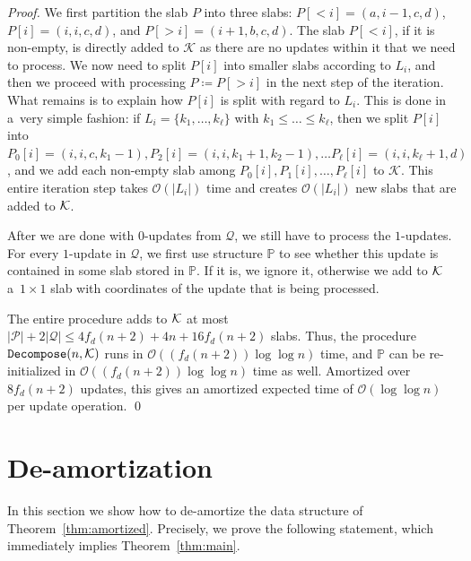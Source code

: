 \documentclass[runningheads]{llncs}
\newcommand{\Oh}{\mathcal{O}}
\renewcommand{\leq}{\leqslant}
\begin{document}
\begin{proof}
We first partition the slab $P$ into three slabs:
$P[<i] = (a,i-1,c,d)$,
$P[i]=(i,i,c,d)$, and
$P[>i]= (i+1,b,c,d)$. The slab $P[<i]$, if it is
non-empty, is directly added to $\mathcal{K}$ as there are
no updates within it that we need to process. We now need to
split $P[i]$ into smaller slabs according to $L_i$, and then we proceed with
processing
$P\coloneqq P[>i]$ in the next step of the iteration. What remains
is to explain how $P[i]$ is split with regard to $L_i$. This is
done in a~very simple fashion: if $L_i=\{ k_1,\ldots,k_\ell \}$ with $k_1\leq \ldots\leq k_\ell$, then
we split $P[i]$ into
$P_0[i]=(i,i,c,k_1-1), P_2[i]=(i,i,k_1+1,k_2-1),
\ldots P_{\ell}[i]=(i,i,k_\ell+1,d)$, and we add each non-empty
slab
among $P_0[i],P_1[i], \ldots, P_\ell[i]$ to $\mathcal{K}$.
This entire iteration step takes $\Oh(|L_i|)$ time and
creates $\Oh(|L_i|)$ new slabs that are added to $\cal K$.

After we are done with $0$-updates from $\mathcal{Q}$,
we still have to process the $1$-updates. For
every $1$-update in $\mathcal{Q}$, we first use
structure $\mathbb{P}$ to see whether this update is contained
in some slab stored in $\mathbb{P}$. If it is, we ignore it,
otherwise we add to $\cal K$ a~$1 \times 1$ slab with
coordinates of the update that is being processed.

The entire procedure adds to $\cal K$ at most
$|\mathcal{P}|+2|\mathcal{Q}| \leq 4 f_d(n+2)+4n + 16 f_d(n+2)$ slabs.
Thus, the procedure $\mathtt{Decompose}(n,\cal K)$
runs in $\Oh(( f_d (n+2))\log \log n)$ time, and $\mathbb{P}$
can be re-initialized in $\Oh(( f_d (n+2))\log \log n)$ time as well.
Amortized over $8 f_d(n+2)$ updates, this gives
an amortized expected time of $\Oh(\log \log n)$ per update operation.
\qed\end{proof}
 
\section{De-amortization}
\label{sec:wcase}

In this section we show how to de-amortize the data structure
of
Theorem~\ref{thm:amortized}. Precisely, we prove the following statement, which immediately implies Theorem~\ref{thm:main}.
\end{document}
